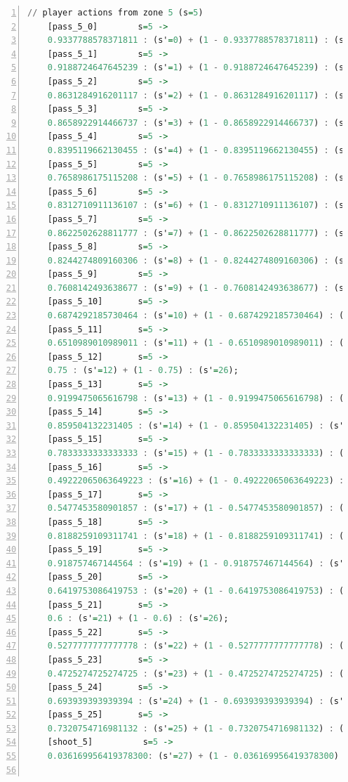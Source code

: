 \documentclass{l4proj}
\begin{document}
\begin{appendices}
\begin{lstlisting}[language=Haskell, numbers=left, caption=MDP used for strategy generation. This is the model specification as-is after the refinements at the end of chapter 3.]
	// player actions from zone 5 (s=5)
	[pass_5_0]	      s=5 ->
	0.9337788578371811 : (s'=0) + (1 - 0.9337788578371811) : (s'=26);
	[pass_5_1]	      s=5 ->
	0.9188724647645239 : (s'=1) + (1 - 0.9188724647645239) : (s'=26);
	[pass_5_2]	      s=5 ->
	0.8631284916201117 : (s'=2) + (1 - 0.8631284916201117) : (s'=26);
	[pass_5_3]	      s=5 ->
	0.8658922914466737 : (s'=3) + (1 - 0.8658922914466737) : (s'=26);
	[pass_5_4]	      s=5 ->
	0.8395119662130455 : (s'=4) + (1 - 0.8395119662130455) : (s'=26);
	[pass_5_5]	      s=5 ->
	0.7658986175115208 : (s'=5) + (1 - 0.7658986175115208) : (s'=26);
	[pass_5_6]	      s=5 ->
	0.8312710911136107 : (s'=6) + (1 - 0.8312710911136107) : (s'=26);
	[pass_5_7]	      s=5 ->
	0.8622502628811777 : (s'=7) + (1 - 0.8622502628811777) : (s'=26);
	[pass_5_8]	      s=5 ->
	0.8244274809160306 : (s'=8) + (1 - 0.8244274809160306) : (s'=26);
	[pass_5_9]	      s=5 ->
	0.7608142493638677 : (s'=9) + (1 - 0.7608142493638677) : (s'=26);
	[pass_5_10]	      s=5 ->
	0.6874292185730464 : (s'=10) + (1 - 0.6874292185730464) : (s'=26);
	[pass_5_11]	      s=5 ->
	0.6510989010989011 : (s'=11) + (1 - 0.6510989010989011) : (s'=26);
	[pass_5_12]	      s=5 ->
	0.75 : (s'=12) + (1 - 0.75) : (s'=26);
	[pass_5_13]	      s=5 ->
	0.9199475065616798 : (s'=13) + (1 - 0.9199475065616798) : (s'=26);
	[pass_5_14]	      s=5 ->
	0.859504132231405 : (s'=14) + (1 - 0.859504132231405) : (s'=26);
	[pass_5_15]	      s=5 ->
	0.7833333333333333 : (s'=15) + (1 - 0.7833333333333333) : (s'=26);
	[pass_5_16]	      s=5 ->
	0.49222065063649223 : (s'=16) + (1 - 0.49222065063649223) : (s'=26);
	[pass_5_17]	      s=5 ->
	0.5477453580901857 : (s'=17) + (1 - 0.5477453580901857) : (s'=26);
	[pass_5_18]	      s=5 ->
	0.8188259109311741 : (s'=18) + (1 - 0.8188259109311741) : (s'=26);
	[pass_5_19]	      s=5 ->
	0.918757467144564 : (s'=19) + (1 - 0.918757467144564) : (s'=26);
	[pass_5_20]	      s=5 ->
	0.6419753086419753 : (s'=20) + (1 - 0.6419753086419753) : (s'=26);
	[pass_5_21]	      s=5 ->
	0.6 : (s'=21) + (1 - 0.6) : (s'=26);
	[pass_5_22]	      s=5 ->
	0.5277777777777778 : (s'=22) + (1 - 0.5277777777777778) : (s'=26);
	[pass_5_23]	      s=5 ->
	0.4725274725274725 : (s'=23) + (1 - 0.4725274725274725) : (s'=26);
	[pass_5_24]	      s=5 ->
	0.693939393939394 : (s'=24) + (1 - 0.693939393939394) : (s'=26);
	[pass_5_25]	      s=5 ->
	0.7320754716981132 : (s'=25) + (1 - 0.7320754716981132) : (s'=26);
	[shoot_5]	       s=5 ->
	0.036169956419378300: (s'=27) + (1 - 0.036169956419378300) : (s'=26);


\end{lstlisting}
\end{appendices}
\end{document}
